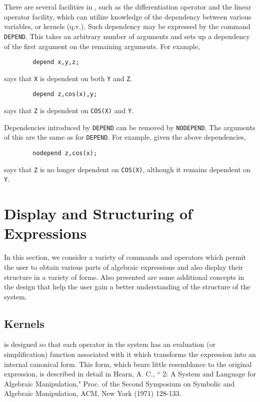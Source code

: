 There are several facilities in {\REDUCE}, such as the differentiation
operator and the linear operator facility, which
can utilize knowledge of the dependency between various variables, or
kernels (q.v.).  Such dependency may be expressed by the command {\tt
DEPEND}.  This takes an arbitrary number of arguments and
sets up a dependency of the first argument on the remaining arguments.
For example,
\begin{verbatim}
        depend x,y,z;
\end{verbatim}
says that {\tt X} is dependent on both {\tt Y} and {\tt Z}.
\begin{verbatim}
        depend z,cos(x),y;
\end{verbatim}
says that {\tt Z} is dependent on {\tt COS(X)} and {\tt Y}.

Dependencies introduced by {\tt DEPEND} can be removed by {\tt NODEPEND}.
 The arguments of this are the same as for {\tt DEPEND}.
For example, given the above dependencies,
\begin{verbatim}
        nodepend z,cos(x);
\end{verbatim}
says that {\tt Z} is no longer dependent on {\tt COS(X)}, although it remains
dependent on {\tt Y}.

\chapter{Display and Structuring of Expressions}
In this section, we consider a variety of commands and operators which
permit the user to obtain various parts of algebraic expressions and also
display their structure in a variety of forms. Also presented are some
additional concepts in the {\REDUCE} design that help the user gain a better
understanding of the structure of the system.

\section{Kernels}
{\REDUCE} is designed so that each operator in the system has an
evaluation (or simplification) function associated
with it which transforms the expression into an internal canonical form.
  This form, which bears little resemblance to the
original expression, is described in detail in Hearn, A. C., ``{\REDUCE} 2:
A System and Language for Algebraic Manipulation," Proc. of the Second
Symposium on Symbolic and Algebraic Manipulation, ACM, New York (1971)
128-133.

